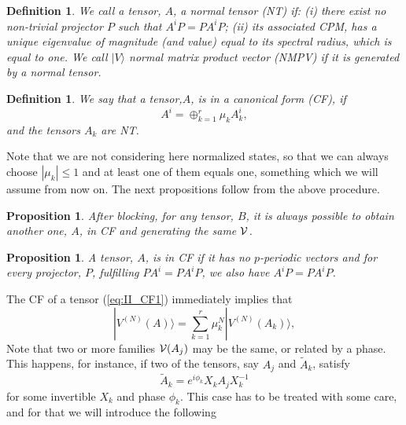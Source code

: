 \documentclass{elsarticle}
\newcommand{\be}{\begin{equation}}
\newcommand{\ee}{\end{equation}}
\newtheorem{prop}[thm]{Proposition}
\newtheorem{defn}[thm]{Definition}
\begin{document}
\begin{defn}
    We call a tensor, $A$, a {\em normal tensor} (NT) if: (i) there exist no non-trivial projector $P$ such that $A^iP=PA^iP$; (ii) its associated CPM, has a unique eigenvalue of magnitude (and value) equal to its spectral radius, which is equal to one. We call $|V\rangle$ {\em normal matrix product vector} (NMPV) if it is generated by a normal tensor.
\end{defn}

\begin{defn}
    We say that a tensor,$A$, is in a {\em canonical form} (CF), if
    \be
        \label{eq:II_CF1}
        A^i = \oplus_{k=1}^r \mu_k A^i_k,
    \ee
    and the tensors  $A_k$ are NT.
\end{defn}

Note that we are not considering here normalized states, so that we can always choose $|\mu_k|\le 1$ and at least one of them equals one, something which we will assume from now on.
The next propositions follow from the above procedure.

\begin{prop}
    After blocking, for any tensor, $B$, it is always possible to obtain another one, $A$, in CF and generating the same ${\cal V}$.
\end{prop}

\begin{prop}
    A tensor, $A$, is in CF if it has no $p$-periodic vectors and for every projector, $P$, fulfilling $PA^i=PA^iP$, we also have $A^iP=PA^iP$.
\end{prop}


The CF of a tensor (\ref{eq:II_CF1}) immediately implies that
\be
    \label{eq:II_Psi_k}
    |V^{(N)}(A)\rangle = \sum_{k=1}^r \mu_k^N|V^{(N)}(A_k)\rangle,
\ee
Note that two or more families ${\cal V}(A_j)$ may be the same, or related by a phase. This happens, for instance, if two of the tensors, say $A_j$ and $\tilde A_k$, satisfy
\be
    \label{eq:II:A=XAX}
    \tilde A_k = e^{i\phi_k} X_k A_j X_k^{-1}
\ee
for some invertible $X_k$ and phase $\phi_k$. This case has to be treated with some care, and for that we will introduce the following
\end{document}
